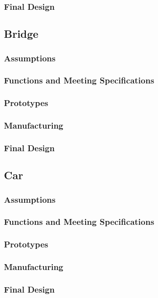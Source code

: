 \documentclass[fleqn,12pt]{project}
\begin{document}
\subsubsection{Final Design}

\subsection{Bridge}
\subsubsection{Assumptions}
\subsubsection{Functions and Meeting Specifications}
\subsubsection{Prototypes}
\subsubsection{Manufacturing}
\subsubsection{Final Design}

\subsection{Car}
\subsubsection{Assumptions}
\subsubsection{Functions and Meeting Specifications}
\subsubsection{Prototypes}
\subsubsection{Manufacturing}
\subsubsection{Final Design}
\end{document}

